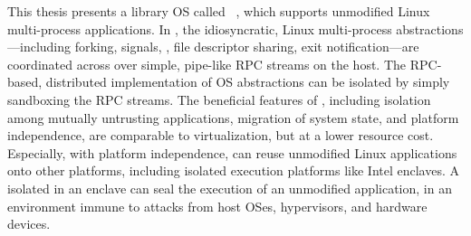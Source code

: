 This thesis presents a library OS called \graphene{}~\cite{tsai14graphene},
which supports unmodified Linux multi-process applications.
In \graphene{},
the idiosyncratic, Linux multi-process abstractions---including forking, signals, \sysvipc{}, file descriptor sharing, exit notification---are coordinated
across \picoprocs{}
over simple, pipe-like RPC streams on the host.
The RPC-based, distributed implementation of OS abstractions
can be isolated by simply sandboxing the RPC streams.
The beneficial features of \graphene{}, %
including isolation among mutually untrusting applications,
migration of system state,
and platform independence,
are comparable to virtualization,
but at a lower resource cost.
Especially, with platform independence, \graphene{}
can reuse unmodified Linux applications
onto other platforms,
including isolated execution platforms like Intel \sgx{} enclaves.
A \graphene{} \picoproc{} isolated in an enclave
can seal the execution of an unmodified application,
in an environment immune to attacks from host OSes, hypervisors,
and hardware devices.





